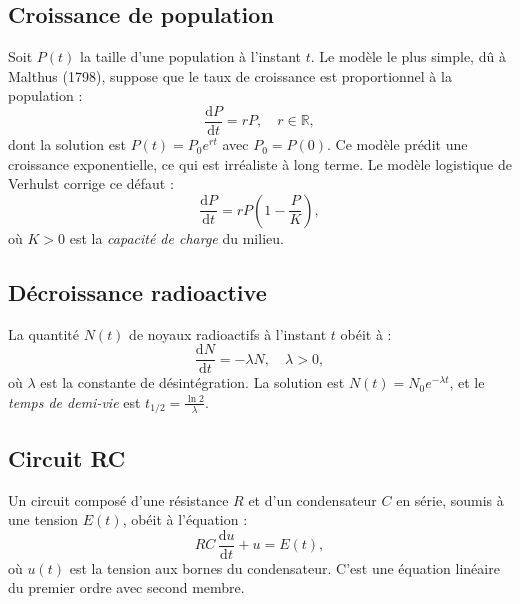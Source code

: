 \documentclass[12pt,a4paper,openany]{book}
\theoremstyle{definition}
\theoremstyle{plain}
\theoremstyle{remark}
\newcommand{\R}{\mathbb{R}}
\newcommand{\dd}{\mathrm{d}}
\begin{document}
\subsection{Croissance de population}
\label{subsec:population}

Soit $P(t)$ la taille d'une population à l'instant $t$. Le modèle le plus simple, dû à Malthus (1798), suppose que le taux de croissance est proportionnel à la population :
\begin{equation}
\label{eq:malthus}
\frac{\dd P}{\dd t} = rP, \quad r \in \R,
\end{equation}
dont la solution est $P(t) = P_0 e^{rt}$ avec $P_0 = P(0)$. Ce modèle prédit une croissance exponentielle, ce qui est irréaliste à long terme. Le modèle logistique de Verhulst corrige ce défaut :
\begin{equation}
\label{eq:logistique}
\frac{\dd P}{\dd t} = rP\!\left(1 - \frac{P}{K}\right),
\end{equation}
où $K > 0$ est la \emph{capacité de charge} du milieu.

\subsection{Décroissance radioactive}
\label{subsec:radioactivite}

La quantité $N(t)$ de noyaux radioactifs à l'instant $t$ obéit à :
\begin{equation}
\label{eq:radioactivite}
\frac{\dd N}{\dd t} = -\lambda N, \quad \lambda > 0,
\end{equation}
où $\lambda$ est la constante de désintégration. La solution est $N(t) = N_0 e^{-\lambda t}$, et le \emph{temps de demi-vie} est $t_{1/2} = \frac{\ln 2}{\lambda}$.

\subsection{Circuit RC}
\label{subsec:circuit-RC}

Un circuit composé d'une résistance $R$ et d'un condensateur $C$ en série, soumis à une tension $E(t)$, obéit à l'équation :
\begin{equation}
\label{eq:circuit-RC}
RC\,\frac{\dd u}{\dd t} + u = E(t),
\end{equation}
où $u(t)$ est la tension aux bornes du condensateur. C'est une équation linéaire du premier ordre avec second membre.
\end{document}
